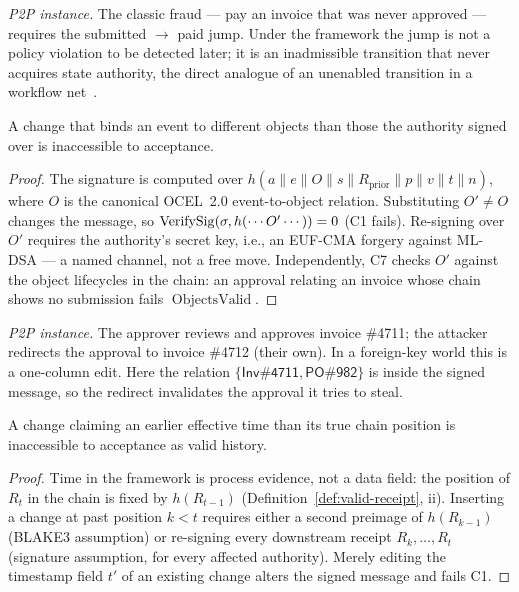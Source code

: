 \emph{P2P instance.} The classic fraud --- pay an invoice that was never
approved --- requires the \textsf{submitted} $\to$ \textsf{paid} jump. Under
the framework the jump is not a policy violation to be detected later; it is an
inadmissible transition that never acquires state authority, the direct analogue
of an unenabled transition in a workflow
net~\cite{van_der_aalst_wfnet_soundness_1997}.

\begin{proposition}
\label{prop:objsub}
A change that binds an event to different objects than those the authority
signed over is inaccessible to acceptance.
\end{proposition}
\begin{proof}
The signature is computed over
$h(a \| e \| O \| s \| R_{\mathrm{prior}} \| p \| v \| t \| n)$, where $O$ is
the canonical OCEL~2.0 event-to-object relation. Substituting $O' \neq O$
changes the message, so $\operatorname{VerifySig}(\sigma, h(\cdots O' \cdots)) = 0$ (C1
fails). Re-signing over $O'$ requires the authority's secret key, i.e., an
EUF-CMA forgery against ML-DSA --- a named channel, not a free move.
Independently, C7 checks $O'$ against the object lifecycles in the chain: an
approval relating an invoice whose chain shows no submission fails
$\operatorname{ObjectsValid}$.
\end{proof}

\emph{P2P instance.} The approver reviews and approves invoice \#4711; the
attacker redirects the approval to invoice \#4712 (their own). In a
foreign-key world this is a one-column edit. Here the relation
$\{\textsf{Inv\#4711}, \textsf{PO\#982}\}$ is inside the signed message, so the
redirect invalidates the approval it tries to steal.

\begin{proposition}
\label{prop:backdate}
A change claiming an earlier effective time than its true chain position is
inaccessible to acceptance as valid history.
\end{proposition}
\begin{proof}
Time in the framework is process evidence, not a data field: the position of
$R_t$ in the chain is fixed by $h(R_{t-1})$ (Definition~\ref{def:valid-receipt},
ii). Inserting a change at past position $k < t$ requires either a second
preimage of $h(R_{k-1})$ (BLAKE3 assumption) or re-signing every downstream
receipt $R_k, \ldots, R_t$ (signature assumption, for every affected
authority). Merely editing the timestamp field $t'$ of an existing change
alters the signed message and fails C1.
\end{proof}

